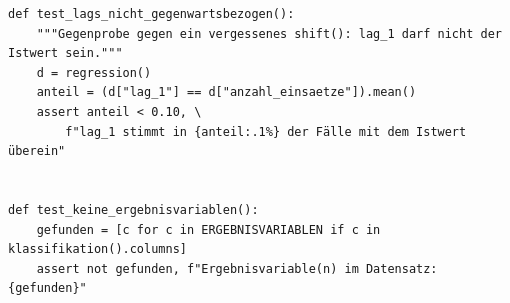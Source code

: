 \begin{lstlisting}[style=pythonstil,
  label={lst:tests},
  caption={Zwei der neunzehn Prüfungen an den erzeugten Dateien
           (\texttt{tests/test\_aufbereitung.py}, Z.~255--260 und 277--285,
           gekürzt)}]
def test_lags_nicht_gegenwartsbezogen():
    """Gegenprobe gegen ein vergessenes shift(): lag_1 darf nicht der Istwert sein."""
    d = regression()
    anteil = (d["lag_1"] == d["anzahl_einsaetze"]).mean()
    assert anteil < 0.10, \
        f"lag_1 stimmt in {anteil:.1%} der Fälle mit dem Istwert überein"


def test_keine_ergebnisvariablen():
    gefunden = [c for c in ERGEBNISVARIABLEN if c in klassifikation().columns]
    assert not gefunden, f"Ergebnisvariable(n) im Datensatz: {gefunden}"
\end{lstlisting}
